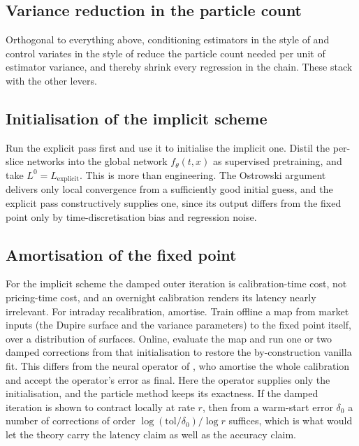 \documentclass[11pt,a4paper]{article}
\theoremstyle{plain}
\theoremstyle{definition}
\theoremstyle{definition}
\newcommand{\Lev}{L}
\begin{document}
\subsection{Variance reduction in the particle count}

Orthogonal to everything above, conditioning estimators in the style of \citet{muguruza2019} and control variates in the style of \citet{cozma2019} reduce the particle count needed per unit of estimator variance, and thereby shrink every regression in the chain. These stack with the other levers.

\subsection{Initialisation of the implicit scheme}

Run the explicit pass first and use it to initialise the implicit one. Distil the per-slice networks into the global network $f_\theta(t,x)$ as supervised pretraining, and take $\Lev^{0} = \Lev_{\mathrm{explicit}}$. This is more than engineering. The Ostrowski argument delivers only local convergence from a sufficiently good initial guess, and the explicit pass constructively supplies one, since its output differs from the fixed point only by time-discretisation bias and regression noise.

\subsection{Amortisation of the fixed point}

For the implicit scheme the damped outer iteration is calibration-time cost, not pricing-time cost, and an overnight calibration renders its latency nearly irrelevant. For intraday recalibration, amortise. Train offline a map from market inputs (the Dupire surface and the variance parameters) to the fixed point itself, over a distribution of surfaces. Online, evaluate the map and run one or two damped corrections from that initialisation to restore the by-construction vanilla fit. This differs from the neural operator of \citet{wang2026}, who amortise the whole calibration and accept the operator's error as final. Here the operator supplies only the initialisation, and the particle method keeps its exactness. If the damped iteration is shown to contract locally at rate $r$, then from a warm-start error $\delta_0$ a number of corrections of order $\log(\mathrm{tol}/\delta_0)/\log r$ suffices, which is what would let the theory carry the latency claim as well as the accuracy claim.
\end{document}
